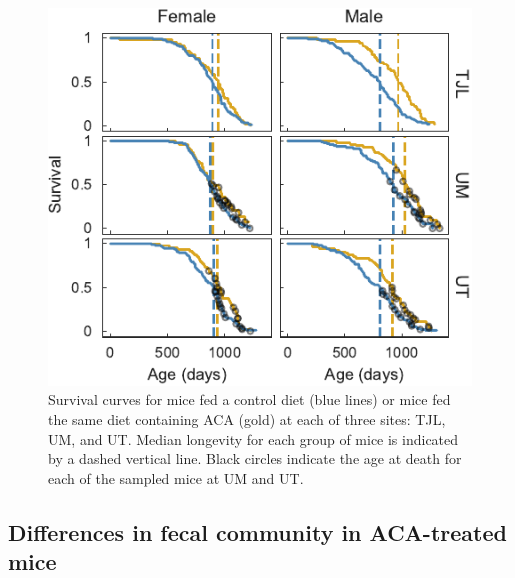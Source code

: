 \documentclass{doc/template/bmcart-nofigbox}
\begin{document}
\begin{figure}[h!]
  \includegraphics{fig/survival_sample.pdf}
  \caption{\label{fig:survival_sample}
  Survival curves for mice fed a control diet (blue lines) or mice fed the same
  diet containing ACA (gold) at each of three sites: TJL, UM, and UT\@.
  Median longevity for each group of mice is indicated by a dashed vertical line.
  Black circles indicate the age at death for each of the sampled mice at UM and
  UT\@.
  }
\end{figure}

\subsection*{Differences in fecal community in ACA-treated mice}
\end{document}
